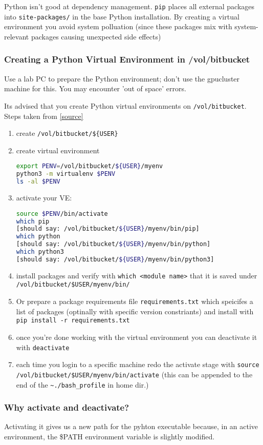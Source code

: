\documentclass[11pt]{article}
\begin{document}
Python isn't good at dependency management. \texttt{pip} places all external packages into \texttt{site-packages/} in the base Python installation. By creating a virtual environment you avoid system polluation (since these packages mix with system-relevant packages causing unexpected side effects)

\subsubsection{Creating a Python Virtual Environment in /vol/bitbucket}

\begin{warning}
    Use a lab PC to prepare the Python environment; don't use the gpucluster machine for this. You may encounter 'out of space' errors.
\end{warning}

Its advised that you create Python virtual environments on \texttt{/vol/bitbucket}. Steps taken from \href{https://www.imperial.ac.uk/computing/people/csg/guides/python/virtual-environment/#d.en.1235829}{[source]}
\begin{enumerate}
    \item create \verb|/vol/bitbucket/${USER}|
    \item create virtual environment
          \begin{lstlisting}[language=sh]
export PENV=/vol/bitbucket/${USER}/myenv
python3 -m virtualenv $PENV
ls -al $PENV
          \end{lstlisting}
    \item activate your VE:
          \begin{lstlisting}[language=sh]
source $PENV/bin/activate
which pip
[should say: /vol/bitbucket/${USER}/myenv/bin/pip]
which python
[should say: /vol/bitbucket/${USER}/myenv/bin/python]
which python3
[should say: /vol/bitbucket/${USER}/myenv/bin/python3]
          \end{lstlisting}
    \item install packages and verify with \texttt{which <module name>} that it is saved under \texttt{/vol/bitbucket/\${USER}/myenv/bin/}
    \item Or prepare a package requirements file \texttt{requirements.txt} which speicifes a list of packages (optinally with specific version constriants) and install with \texttt{pip install -r requirements.txt}
    \item once you're done working with the virtual environment you can deactivate it with \texttt{deactivate}
    \item each time you login to a specific machine redo the activate stage with \texttt{source /vol/bitbucket/\${USER}/myenv/bin/activate} (this can be appended to the end of the \verb|~./bash_profile| in home dir.)
\end{enumerate}

\subsubsection{Why activate and deactivate?}

Activating it gives us a new path for the pyhton executable because, in an active environment, the \$PATH environment variable is slightly modified.
\end{document}
